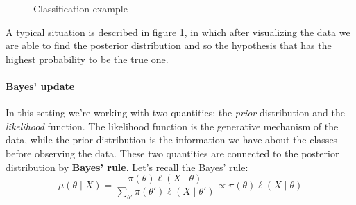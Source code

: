 \begin{figure}
    \centering
    \begin{minipage}{0.45\textwidth}
        \centering
    \end{minipage}

    \vspace{1cm}

    \begin{minipage}{0.45\textwidth}
        \centering
    \end{minipage}

    \caption{Classification example}
    \label{fig:classificationexample}
\end{figure}

A typical situation is described in figure \ref{fig:classificationexample}, in which after visualizing the data we are able to find the posterior distribution and so the hypothesis that has the highest probability to be the true one.

\paragraph*{Bayes' update}
In this setting we're working with two quantities: the \textit{prior} distribution and the \textit{likelihood} function. The likelihood function is the generative mechanism of the data, while the prior distribution is the information we have about the classes before observing the data. These two quantities are connected to the posterior distribution by \textbf{Bayes' rule}.
Let's recall the Bayes' rule:
\[
    \mu(\theta \mid X) = \frac{\pi(\theta) \ell(X \mid \theta)}{\sum_{\theta'} \pi(\theta') \ell(X \mid \theta')} \propto \pi(\theta) \ell(X \mid \theta)
\]

